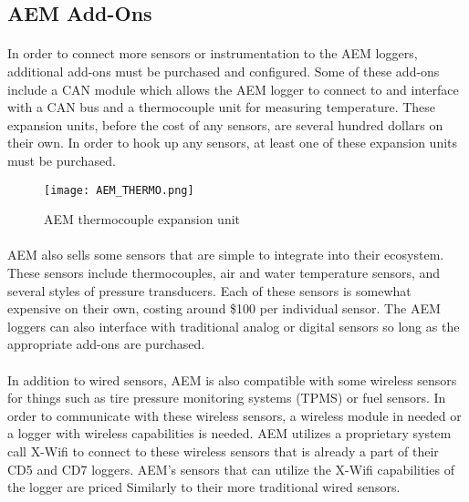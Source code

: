 \subsection{AEM Add-Ons}

\paragraph{}
In order to connect more sensors or instrumentation to the AEM loggers, additional add-ons must be purchased and configured.
Some of these add-ons include a CAN module which allows the AEM logger to connect to and interface with a CAN bus and a thermocouple unit for measuring temperature.
These expansion units, before the cost of any sensors, are several hundred dollars on their own.
In order to hook up any sensors, at least one of these expansion units must be purchased.

\begin{figure}[H]
	\centering
	\texttt{[image: AEM\_THERMO.png]}
	\caption{AEM thermocouple expansion unit}
	\label{fig:AEM_THERMO}
\end{figure}

\paragraph{}
AEM also sells some sensors that are simple to integrate into their ecosystem.
These sensors include thermocouples, air and water temperature sensors, and several styles of pressure transducers.
Each of these sensors is somewhat expensive on their own, costing around \$100 per individual sensor.
The AEM loggers can also interface with traditional analog or digital sensors so long as the appropriate add-ons are purchased.

\paragraph{}
In addition to wired sensors, AEM is also compatible with some wireless sensors for things such as tire pressure monitoring systems (TPMS) or fuel sensors.
In order to communicate with these wireless sensors, a wireless module in needed or a logger with wireless capabilities is needed.
AEM utilizes a proprietary system call X-Wifi to connect to these wireless sensors that is already a part of their CD5 and CD7 loggers.
AEM's sensors that can utilize the X-Wifi capabilities of the logger are priced Similarly to their more traditional wired sensors.

